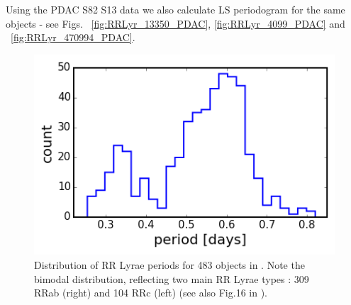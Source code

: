 \documentclass[DM,lsstdraft,toc,usenatbib]{lsstdoc}
\begin{document}
Using the PDAC S82 S13 data  we also calculate LS periodogram for the same objects -  see Figs. ~\ref{fig:RRLyr_13350_PDAC}, \ref{fig:RRLyr_4099_PDAC} and ~\ref{fig:RRLyr_470994_PDAC}.









\begin{figure}
\begin{centering}
\includegraphics[width=0.7\columnwidth]{figs/Fig_1_Sesar_2010_RRLyr}
\caption{ Distribution of RR Lyrae periods  for 483 objects in \citep{sesar2010}. Note the bimodal distribution, reflecting two main RR Lyrae types : 309 RRab (right) and 104 RRc (left) (see also Fig.16 in \citep{sesar2010}).}
\label{fig:RRLyr_distribution}
\end{centering}
\end{figure}
\end{document}
